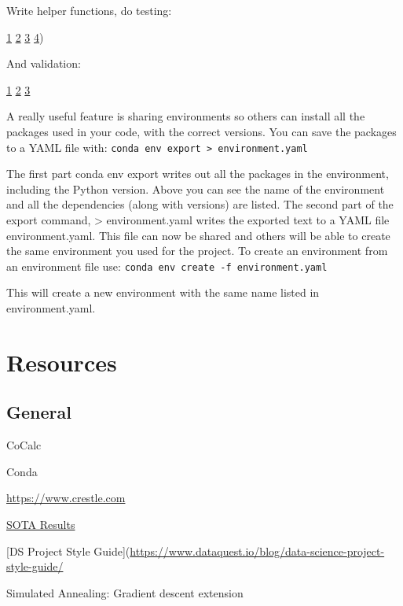 \documentclass[]{book}
\begin{document}
Write helper functions, do testing:

\href{http://engineering.pivotal.io/post/test-driven-development-for-data-science/}{1}
\textbar{} \href{http://www.tdda.info/}{2} \textbar{}
\href{http://stochasticsolutions.com/}{3} \textbar{}
\href{https://github.com/ericmjl/data-testing-tutorial}{4})

And validation:

\href{https://github.com/data-cleaning/validate}{1} \textbar{}
\href{https://rdrr.io/cran/checkmate/}{2} \textbar{}
\href{https://github.com/shawnbrown/datatest}{3}

A really useful feature is sharing environments so others can install
all the packages used in your code, with the correct versions. You can
save the packages to a YAML file with:
\texttt{conda\ env\ export\ \textgreater{}\ environment.yaml}

The first part conda env export writes out all the packages in the
environment, including the Python version. Above you can see the name of
the environment and all the dependencies (along with versions) are
listed. The second part of the export command, \textgreater{}
environment.yaml writes the exported text to a YAML file
environment.yaml. This file can now be shared and others will be able to
create the same environment you used for the project. To create an
environment from an environment file use:
\texttt{conda\ env\ create\ -f\ environment.yaml}

This will create a new environment with the same name listed in
environment.yaml.

\section{Resources}\label{resources}

\subsection{General}\label{general}

CoCalc

Conda

\url{https://www.crestle.com}

\href{https://paperswithcode.com/sota}{SOTA Results}

{[}DS Project Style
Guide{]}(\url{https://www.dataquest.io/blog/data-science-project-style-guide/}

Simulated Annealing: Gradient descent extension
\end{document}
